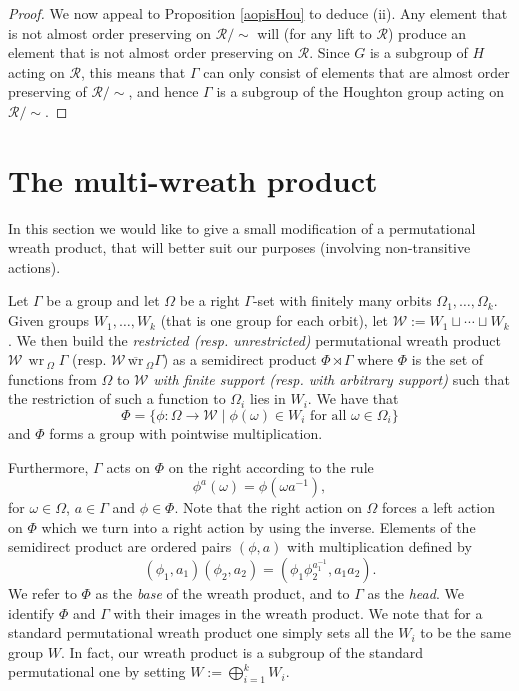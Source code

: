 \documentclass[11pt,a4paper]{amsart}
\theoremstyle{definition}
\theoremstyle{remark}
\newcommand{\Ra}{\mathcal{R}}
\renewcommand{\wr}{\operatorname{\,wr\,}}
\newcommand{\Wr}{\operatorname{\,\overline{wr}\,}}
\begin{document}
\begin{proof}
	
We now appeal to Proposition \ref{aopisHou} to deduce (ii). Any element that is not almost order preserving on $\Ra/\sim$ will (for any lift to $\Ra$) produce an element that is not almost order preserving on $\Ra$. Since $G$ is a subgroup of $H$ acting on $\Ra$, this means that $\Gamma$ can only consist of elements that are almost order preserving of $\Ra/\sim$, and hence $\Gamma$ is a subgroup of the Houghton group acting on $\Ra/\sim$.
\end{proof}
\section{The multi-wreath product}\label{sec:multiwreath}

In this section we would like to give a small modification of a permutational wreath product, that will better suit our purposes (involving non-transitive actions).

Let $\Gamma$ be a group and let $\Omega$ be a right $\Gamma$-set with finitely many orbits $\Omega_1, \ldots, \Omega_k$. Given groups $W_1, \ldots, W_k$ (that is one group for each orbit), let $\mathcal{W}:= W_1 \sqcup \cdots \sqcup W_k$. We then build the \emph{restricted (resp. unrestricted)} permutational wreath product $\mathcal{W}\wr_\Omega \Gamma$ (resp.  $\mathcal{W}\Wr_\Omega \Gamma$) as a semidirect product $\Phi\rtimes \Gamma$ where $\Phi$ is the set of functions from $\Omega$ to $\mathcal{W}$ \emph{with finite support (resp. with arbitrary support)} such that the restriction of such a function to $\Omega_i$ lies in $W_i$. We have that
$$\Phi=\{\phi: \Omega \to \mathcal{W} \mid \phi(\omega)\in W_i\text{ for all }\omega\in \Omega_i\}$$
and $\Phi$ forms a group with pointwise multiplication.

Furthermore, $\Gamma$ acts on $\Phi$ on the right according to the rule
$$\phi^a(\omega)=\phi(\omega a^{-1}),$$
for $\omega\in\Omega$, $a\in \Gamma$ and $\phi\in\Phi$. Note that the right action on $\Omega$ forces a left action on $\Phi$ which we turn into a right action by using the inverse.
Elements of the semidirect product are ordered pairs $(\phi, a)$ with multiplication defined by
$$(\phi_1, a_1)(\phi_2, a_2)=(\phi_1\phi_2^{a_1^{-1}}, a_1a_2).$$
We refer to $\Phi$ as the \emph{base} of the wreath product, and to $\Gamma$ as the \emph{head}. We identify $\Phi$ and $\Gamma$ with their images in the wreath product. We note that for a standard permutational wreath product one simply sets all the $W_i$ to be the same group $W$. In fact, our wreath product is a subgroup of the standard permutational one by setting $W:=\bigoplus_{i=1}^kW_i$.
\end{document}
